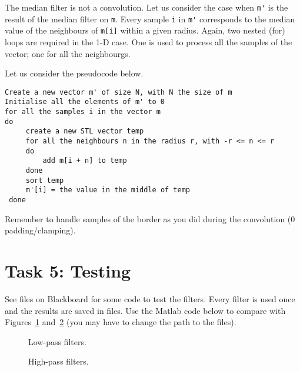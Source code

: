\documentclass[english,a4paper,12pt,oneside]{article}
\begin{document}
The median filter is not a convolution. Let us consider the case when \verb+m'+ is the result of the median filter on \verb+m+.  Every sample \verb+i+ in \verb+m'+ corresponds to the median value of the neighbours of \verb+m[i]+ within a given radius.
Again, two nested (for) loops are required in the 1-D case. One is used to process all the samples of the vector; one for all the neighbourgs. 

Let us consider the pseudocode below. 
\begin{verbatim}
Create a new vector m' of size N, with N the size of m
Initialise all the elements of m' to 0
for all the samples i in the vector m
do
     create a new STL vector temp
     for all the neighbours n in the radius r, with -r <= n <= r
     do
         add m[i + n] to temp
     done
     sort temp
     m'[i] = the value in the middle of temp
 done
\end{verbatim}

Remember to handle samples of the border as you did during the convolution (0 padding/clamping).


\section*{Task 5: Testing}

See files on Blackboard for some code to test the filters. 
Every filter is used once and the results are saved in files. 
Use the Matlab code below to compare with Figures~\ref{fig:low_pass_filters} and~\ref{fig:high_pass_filters} (you may have to change the path to the files).

\begin{figure}[htb]
\centering
\scalebox{0.75}{}
 \caption{\label{fig:low_pass_filters}Low-pass filters.}
\end{figure}



\begin{figure}[htb]
\centering
\scalebox{0.75}{}
 \caption{\label{fig:high_pass_filters}High-pass filters.}
\end{figure}
\end{document}
